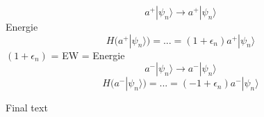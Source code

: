 \begin{equation}
	a^+ |\psi_n\rangle \rightarrow a^+ | \psi_n\rangle
\end{equation}
Energie
\begin{equation}
	H(a^+ | \psi_n\rangle) = ...
	= (1 + \epsilon_n) a^+ | \psi_n\rangle %
\end{equation}
$(1+\epsilon_n)$ = EW = Energie %
\begin{equation}
	a^- |\psi_n\rangle \rightarrow a^-|\psi_n\rangle
\end{equation}
\begin{equation}
	H(a^-|\psi_n\rangle) = ...
	= (-1 + \epsilon_n) a^- |\psi_n\rangle %
\end{equation}

Final text %
